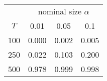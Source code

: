 % 
\begin{tabular}{cccc}
  \hline
  & \multicolumn{3}{c}{nominal size $\alpha$} \\
 $T$ & 0.01 & 0.05 & 0.1 \\
 \hline
100 & 0.000 & 0.002 & 0.005 \\ 
  250 & 0.022 & 0.103 & 0.200 \\ 
  500 & 0.978 & 0.999 & 0.998 \\ 
   \hline
\end{tabular}
